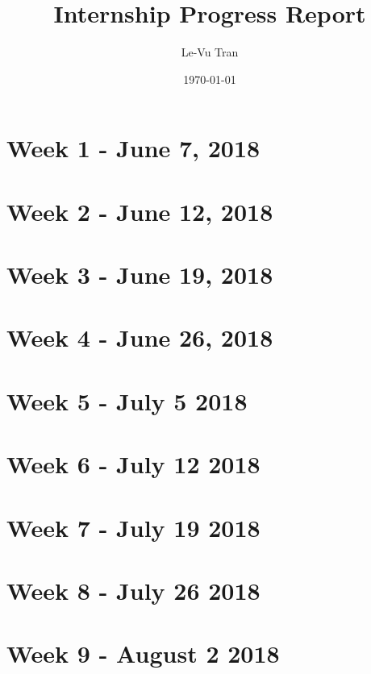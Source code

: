 \documentclass[a4paper]{report}
\title{Internship Progress Report}
\author{Le-Vu Tran}
\date{\today}
\begin{document}
\maketitle

\tableofcontents

\iffalse
\fi
\chapter{Week 1 - June 7, 2018}


\chapter{Week 2 - June 12, 2018}


\chapter{Week 3 - June 19, 2018}


\chapter{Week 4 - June 26, 2018}


\chapter{Week 5 - July 5 2018}


\chapter{Week 6 - July 12 2018}


\chapter{Week 7 - July 19 2018}


\chapter{Week 8 - July 26 2018}


\chapter{Week 9 - August 2 2018}

\end{document}
